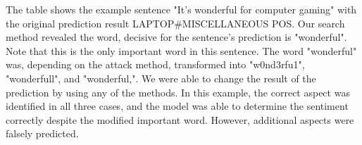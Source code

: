 The table shows the example sentence "It's wonderful for computer gaming" with the original prediction result LAPTOP\#MISCELLANEOUS POS. Our search method revealed the word, decisive for the sentence's prediction is "wonderful". Note that this is the only important word in this sentence. The word "wonderful" was, depending on the attack method, transformed into "w0nd3rfu1", "wonderfull", and "wonderful,". We were able to change the result of the prediction by using any of the methods. In this example, the correct aspect was identified in all three cases, and the model was able to determine the sentiment correctly despite the modified important word. However, additional aspects were falsely predicted. 

\begin{table}[]
\centering
{}
\caption{Results of the three attack methods compared.}
\label{tab:results-table}
\end{table}
